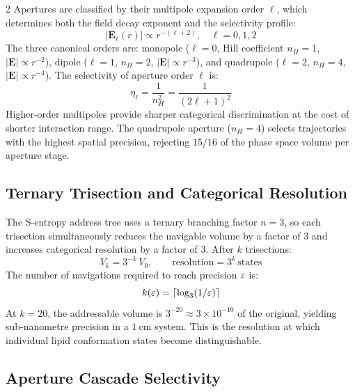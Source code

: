 \begin{multicols}{2}
Apertures are classified by their multipole expansion order $\ell$, which determines both the field decay exponent and the selectivity profile:
\begin{equation}
|\mathbf{E}_\ell(r)| \propto r^{-(\ell + 2)}, \quad \ell = 0, 1, 2
\label{eq:ch11_multipole}
\end{equation}
The three canonical orders are: monopole ($\ell = 0$, Hill coefficient $n_H = 1$, $|\mathbf{E}| \propto r^{-2}$), dipole ($\ell = 1$, $n_H = 2$, $|\mathbf{E}| \propto r^{-3}$), and quadrupole ($\ell = 2$, $n_H = 4$, $|\mathbf{E}| \propto r^{-4}$). The selectivity of aperture order $\ell$ is:
\begin{equation}
\eta_\ell = \frac{1}{n_H^2} = \frac{1}{(2\ell + 1)^2}
\end{equation}
Higher-order multipoles provide sharper categorical discrimination at the cost of shorter interaction range. The quadrupole aperture ($n_H = 4$) selects trajectories with the highest spatial precision, rejecting $15/16$ of the phase space volume per aperture stage.

\subsection{Ternary Trisection and Categorical Resolution}

The S-entropy address tree uses a ternary branching factor $n = 3$, so each trisection simultaneously reduces the navigable volume by a factor of $3$ and increases categorical resolution by a factor of $3$. After $k$ trisections:
\begin{equation}
V_k = 3^{-k}\,V_0, \qquad \text{resolution} = 3^k\,\text{states}
\label{eq:ch11_trisection}
\end{equation}
The number of navigations required to reach precision $\varepsilon$ is:
\begin{equation}
k(\varepsilon) = \left\lceil \log_3(1/\varepsilon) \right\rceil
\label{eq:ch11_keps}
\end{equation}
At $k = 20$, the addressable volume is $3^{-20} \approx 3 \times 10^{-10}$ of the original, yielding sub-nanometre precision in a $1\ \mathrm{cm}$ system. This is the resolution at which individual lipid conformation states become distinguishable.

\subsection{Aperture Cascade Selectivity}
\label{subsec:ch11_cascade}


\end{multicols}
